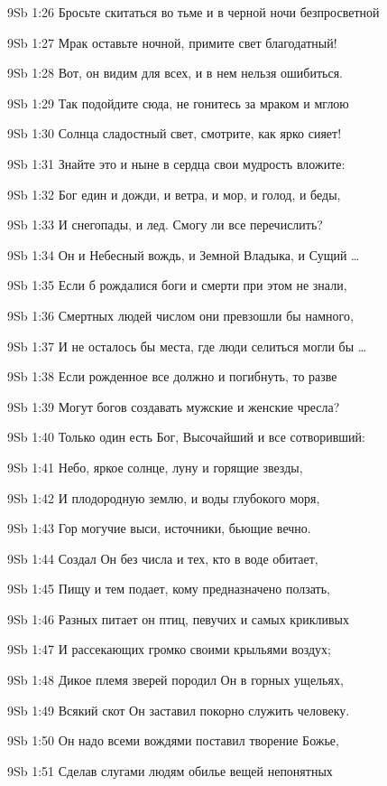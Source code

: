 \vs 9Sb 1:26 Бросьте скитаться во тьме и в черной ночи безпросветной 

\vs 9Sb 1:27 Мрак оставьте ночной, примите свет благодатный!

\vs 9Sb 1:28 Вот, он  видим для всех, и в нем нельзя ошибиться.

\vs 9Sb 1:29 Так подойдите сюда, не гонитесь за мраком и мглою  

\vs 9Sb 1:30 Солнца сладостный свет, смотрите, как ярко сияет!

\vs 9Sb 1:31 Знайте это и ныне в сердца свои мудрость вложите:

\vs 9Sb 1:32 Бог един  и дожди, и ветра, и мор, и голод, и беды,

\vs 9Sb 1:33 И снегопады, и лед. Смогу ли все перечислить?

\vs 9Sb 1:34 Он  и Небесный вождь, и Земной Владыка, и Сущий \ldots

\vs 9Sb 1:35 Если б рождалися боги и смерти при этом не знали,

\vs 9Sb 1:36 Смертных людей числом они превзошли бы намного,

\vs 9Sb 1:37 И не осталось бы места, где люди селиться могли бы \ldots

\vs 9Sb 1:38 Если рожденное все должно и погибнуть, то разве

\vs 9Sb 1:39 Могут богов создавать мужские и женские чресла?

\vs 9Sb 1:40 Только один есть Бог, Высочайший и все сотворивший:

\vs 9Sb 1:41 Небо, яркое солнце, луну и горящие звезды,

\vs 9Sb 1:42 И плодородную землю, и воды глубокого моря,

\vs 9Sb 1:43 Гор могучие выси, источники, бьющие вечно.

\vs 9Sb 1:44 Создал Он без числа и тех, кто в воде обитает,

\vs 9Sb 1:45 Пищу и тем подает, кому предназначено ползать,

\vs 9Sb 1:46 Разных питает он птиц, певучих и самых крикливых

\vs 9Sb 1:47 И рассекающих громко своими крыльями воздух;

\vs 9Sb 1:48 Дикое племя зверей породил Он в горных ущельях,

\vs 9Sb 1:49 Всякий скот Он заставил покорно служить человеку.

\vs 9Sb 1:50 Он надо всеми вождями поставил творение Божье,

\vs 9Sb 1:51 Сделав слугами людям обилье вещей непонятных  

